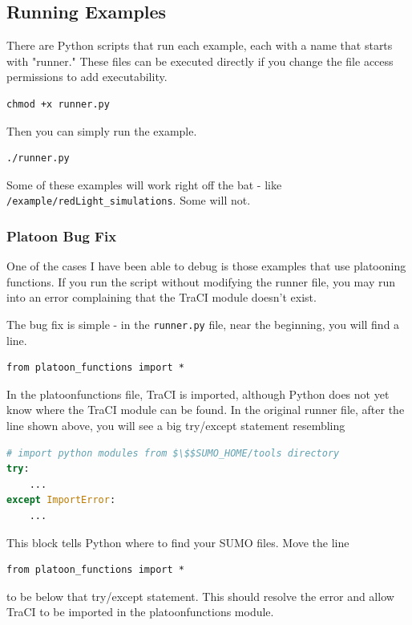 \documentclass[11pt,nofootinbib]{revtex4}
\begin{document}
\subsection{Running Examples}
There are Python scripts that run each example, each with a name that starts with "runner." These files can be executed directly if you change the file access permissions to add executability.
\begin{lstlisting}
chmod +x runner.py
\end{lstlisting}
Then you can simply run the example. 
\begin{lstlisting}
./runner.py
\end{lstlisting}
Some of these examples will work right off the bat - like \verb|/example/redLight_simulations|. Some will not. 

\subsubsection{Platoon Bug Fix}
One of the cases I have been able to debug is those examples that use platooning functions. If you run the script without modifying the runner file, you may run into an error complaining that the TraCI module doesn't exist. 

The bug fix is simple - in the \verb|runner.py| file, near the beginning, you will find a line. 
\begin{lstlisting}
from platoon_functions import *
\end{lstlisting}
In the platoon\textunderscore functions file, TraCI is imported, although Python does not yet know where the TraCI module can be found. In the original runner file, after the line shown above, you will see a big try/except statement resembling
\begin{lstlisting}[language=Python]
# import python modules from $\$$SUMO_HOME/tools directory
try:
    ...
except ImportError:
    ...
\end{lstlisting}
This block tells Python where to find your SUMO files. Move the line
\begin{lstlisting}
from platoon_functions import *
\end{lstlisting}
to be below that try/except statement. This should resolve the error and allow TraCI to be imported in the platoon\textunderscore functions module. 
\end{document}
